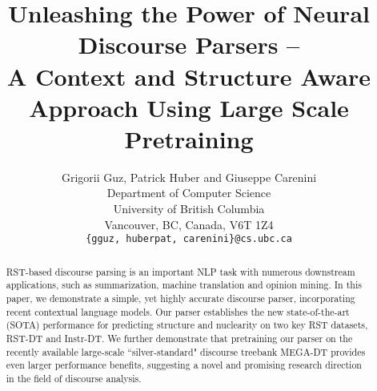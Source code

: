 \documentclass[11pt]{article}
\title{Unleashing the Power of Neural Discourse Parsers -- \\A Context and Structure Aware Approach Using Large Scale Pretraining}
\author{Grigorii Guz, Patrick Huber and Giuseppe Carenini\\
  Department of Computer Science \\
  University of British Columbia \\
  Vancouver, BC, Canada, V6T 1Z4 \\
  {\tt \{gguz, huberpat, carenini\}@cs.ubc.ca}}
\date{}
\begin{document}
\maketitle
\begin{abstract}
RST-based discourse parsing is an important NLP task with numerous downstream applications, such as summarization, machine translation and opinion mining. In this paper, we demonstrate a simple, yet highly accurate discourse parser, incorporating recent contextual language models. Our parser establishes the new state-of-the-art (SOTA) performance for predicting structure and nuclearity on two key RST datasets, RST-DT and Instr-DT. We further demonstrate that pretraining our parser on the recently available large-scale ``silver-standard" discourse treebank MEGA-DT provides even larger performance benefits, suggesting a novel and promising research direction in the field of discourse analysis. 
\end{abstract}
\end{document}
